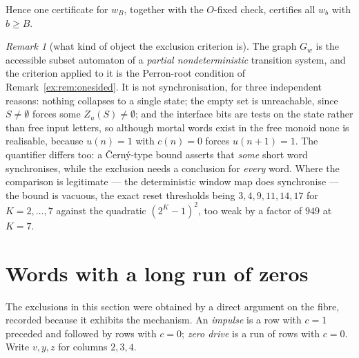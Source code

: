 \documentclass[11pt]{article}
\theoremstyle{definition}
\theoremstyle{remark}
\newtheorem{remark}[theorem]{Remark}
\begin{document}
Hence one certificate for $w_B$, together with the $O$-fixed check, certifies all $w_b$ with $b\ge B$.

\begin{remark}[what kind of object the exclusion criterion is]\label{ex:rem:notsync}
The graph $G_w$ is the accessible subset automaton of a \emph{partial nondeterministic} transition
system, and the criterion applied to it is the Perron-root condition of
Remark~\ref{ex:rem:onesided}. It is not synchronisation, for three independent reasons: nothing
collapses to a single state; the empty set is unreachable, since $S\ne\emptyset$ forces some
$Z_u(S)\ne\emptyset$; and the interface bits are tests on the state rather than free input letters, so
although mortal words exist in the free monoid none is realisable, because $u(n)=1$ with $c(n)=0$
forces $u(n+1)=1$. The quantifier differs too: a \v{C}ern\'y-type bound asserts that \emph{some} short
word synchronises, while the exclusion needs a conclusion for \emph{every} word. Where the comparison
is legitimate --- the deterministic window map does synchronise --- the bound is vacuous, the exact
reset thresholds being $3,4,9,11,14,17$ for $K=2,\dots,7$ against the quadratic $(2^K-1)^2$, too weak
by a factor of $949$ at $K=7$.
\end{remark}

\section{Words with a long run of zeros}

The exclusions in this section were obtained by a direct argument on the fibre, recorded because it exhibits the mechanism. An \emph{impulse} is a row with $c=1$ preceded and followed by rows with $c=0$; \emph{zero drive} is a run of rows with $c=0$. Write $v,y,z$ for columns $2,3,4$.
\end{document}
